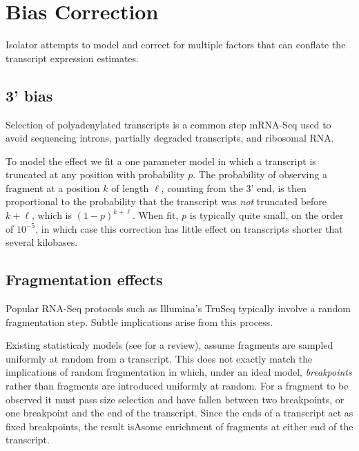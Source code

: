 \documentclass{article}
\begin{document}
%


\section{Bias Correction}\label{bias-correction}

Isolator attempts to model and correct for multiple factors that can
conflate the transcript expression estimates.

\subsection{3' bias}\label{bias}

Selection of polyadenylated transcripts is a common step mRNA-Seq used
to avoid sequencing introns, partially degraded transcripts, and
ribosomal RNA.

To model the effect we fit a one parameter model in which a transcript
is truncated at any position with probability $p$. The probability of
observing a fragment at a position $k$ of length $\ell$, counting from
the 3' end, is then proportional to the probability that the transcript
was \emph{not} truncated before $k + \ell$, which is $(1-p)^{k + \ell}$.
When fit, $p$ is typically quite small, on the order of $10^{-5}$, in
which case this correction has little effect on transcripts shorter that
several kilobases.

\subsection{Fragmentation effects}\label{fragmentation-effects}

Popular RNA-Seq protocols such as Illumina's TruSeq typically involve a
random fragmentation step. Subtle implications arise from this process.

Existing statisticaly models (see \cite{Pachter:2011wm} for a review),
assume fragments are sampled uniformly at random from a transcript. This
does not exactly match the implications of random fragmentation in
which, under an ideal model, \emph{breakpoints} rather than fragments
are introduced uniformly at random. For a fragment to be observed it
must pass size selection and have fallen between two breakpoints, or one
breakpoint and the end of the transcript. Since the ends of a transcript
act as fixed breakpoints, the result isAsome enrichment of fragments at
either end of the transcript.
\end{document}
